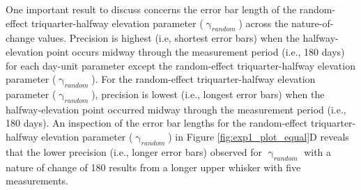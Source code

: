 \documentclass[
12pt, %
twoside,
english]{guelphthesis}
\theoremstyle{definition}
\theoremstyle{definition}
\theoremstyle{definition}
\theoremstyle{definition}
\theoremstyle{remark}
\begin{document}
One important result to discuss concerns the error bar length of the random-effect triquarter-halfway elevation parameter (\(\upgamma_{random}\)) across the nature-of-change values. Precision is highest (i.e, shortest error bars) when the halfway-elevation point occurs midway through the measurement period (i.e., 180 days) for each day-unit parameter except the random-effect triquarter-halfway elevation parameter (\(\upgamma_{random}\)). For the random-effect triquarter-halfway elevation parameter (\(\upgamma_{random}\)), precision is lowest (i.e., longest error bars) when the halfway-elevation point occurred midway through the measurement period (i.e., 180 days). An inspection of the error bar lengths for the random-effect triquarter-halfway elevation parameter (\(\upgamma_{random}\)) in Figure \ref{fig:exp1_plot_equal}D reveals that the lower precision (i.e., longer error bars) observed for \(\upgamma_{random}\) with a nature of change of 180 results from a longer upper whisker with five measurements.
\end{document}
